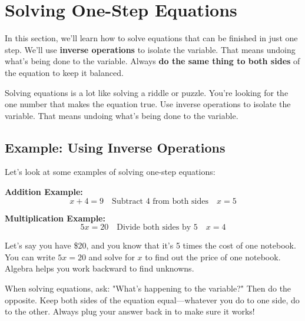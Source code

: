 \cleardoublepage
\section{Solving One-Step Equations}

In this section, we'll learn how to solve equations that can be finished in just one step. We'll use \textbf{inverse operations} to isolate the variable. That means undoing what's being done to the variable. Always \textbf{do the same thing to both sides} of the equation to keep it balanced.

Solving equations is a lot like solving a riddle or puzzle. You're looking for the one number that makes the equation true. Use inverse operations to isolate the variable. That means undoing what's being done to the variable.

\subsection*{Example: Using Inverse Operations}

Let's look at some examples of solving one-step equations:

\textbf{Addition Example:}
\[
x + 4 = 9 \quad \text{Subtract 4 from both sides} \quad x = 5
\]

\textbf{Multiplication Example:}
\[
5x = 20 \quad \text{Divide both sides by 5} \quad x = 4
\]

Let's say you have \$20, and you know that it's 5 times the cost of one notebook. You can write $5x = 20$ and solve for $x$ to find out the price of one notebook. Algebra helps you work backward to find unknowns.

When solving equations, ask: "What's happening to the variable?" Then do the opposite. Keep both sides of the equation equal—whatever you do to one side, do to the other. Always plug your answer back in to make sure it works!




